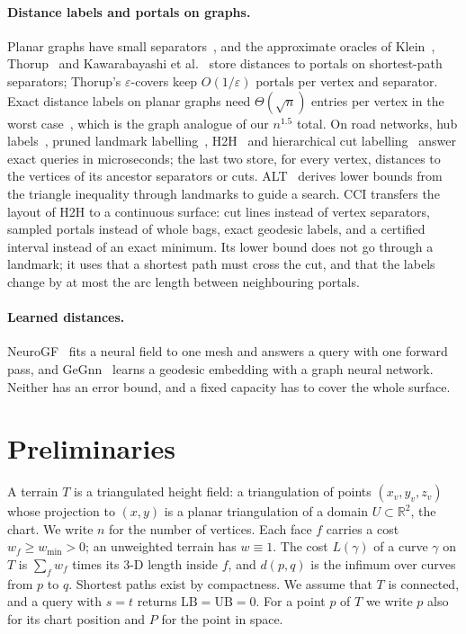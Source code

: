 \documentclass[sigconf,nonacm,screen]{acmart}
\newcommand{\cci}{CCI\xspace}
\newcommand{\LB}{\mathrm{LB}}
\newcommand{\UB}{\mathrm{UB}}
\newcommand{\eps}{\varepsilon}
\begin{document}
\paragraph{Distance labels and portals on graphs.}
Planar graphs have small separators~\cite{lipton1979separator}, and the approximate oracles of
Klein~\cite{klein2002preprocessing}, Thorup~\cite{thorup2004compact} and Kawarabayashi et
al.~\cite{kawarabayashi2011linear} store distances to portals on shortest-path separators; Thorup's
$\eps$-covers keep $O(1/\eps)$ portals per vertex and separator. Exact distance labels on planar graphs need
$\Theta(\sqrt n)$ entries per vertex in the worst case~\cite{gavoille2004distance}, which is the graph analogue
of our $n^{1.5}$ total. On road networks, hub labels~\cite{abraham2011hub}, pruned landmark
labelling~\cite{akiba2013fast}, H2H~\cite{ouyang2018hierarchy} and hierarchical cut
labelling~\cite{farhan2023hierarchical} answer exact queries in microseconds; the last two store, for every
vertex, distances to the vertices of its ancestor separators or cuts. ALT~\cite{goldberg2005computing} derives
lower bounds from the triangle inequality through landmarks to guide a search. \cci transfers the layout of
H2H to a continuous surface: cut lines instead of vertex separators, sampled portals instead of whole bags,
exact geodesic labels, and a certified interval instead of an exact minimum. Its lower bound does not go
through a landmark; it uses that a shortest path must cross the cut, and that the labels change by at most the
arc length between neighbouring portals.

\paragraph{Learned distances.}
NeuroGF~\cite{zhang2023neurogf} fits a neural field to one mesh and answers a query with one forward
pass, and GeGnn~\cite{pang2023learning} learns a geodesic embedding with a graph neural network. Neither has an
error bound, and a fixed capacity has to cover the whole surface.

\section{Preliminaries}
\label{sec:prelim}

A terrain $T$ is a triangulated height field: a triangulation of points $(x_v,y_v,z_v)$ whose projection to
$(x,y)$ is a planar triangulation of a domain $U\subset\mathbb R^2$, the chart. We write $n$ for the number
of vertices. Each face $f$ carries a cost $w_f \ge w_{\min} > 0$; an unweighted terrain has $w\equiv 1$. The
cost $L(\gamma)$ of a curve $\gamma$ on $T$ is $\sum_f w_f$ times its 3-D length inside $f$, and $d(p,q)$ is
the infimum over curves from $p$ to $q$. Shortest paths exist by compactness. We assume that $T$ is connected,
and a query with $s=t$ returns $\LB=\UB=0$. For a point $p$ of $T$ we write
$p$ also for its chart position and $P$ for the point in space.
\end{document}
